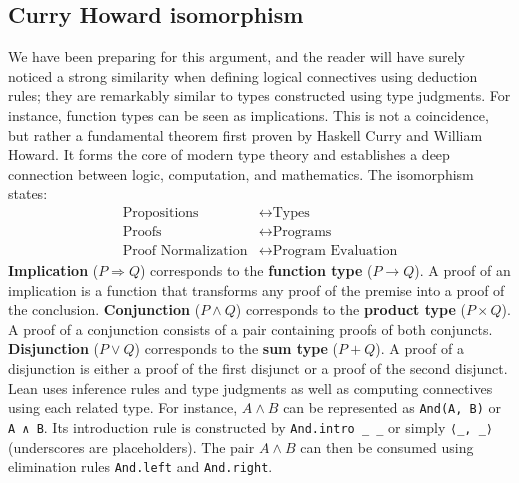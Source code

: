 \subsection{Curry Howard isomorphism}
We have been preparing for this argument, and the reader will have surely
noticed a strong similarity when defining logical connectives
using deduction rules; they are remarkably similar to types
constructed using type judgments. For instance, function
types can be seen as implications.
This is not a coincidence, but rather a fundamental theorem
first proven by Haskell Curry and William Howard.
It forms the core of modern type theory and establishes
a deep connection between logic, computation, and mathematics.
The isomorphism states:
\begin{align*}
  \text{Propositions}        & \leftrightarrow \text{Types}              \\
  \text{Proofs}              & \leftrightarrow \text{Programs}           \\
  \text{Proof Normalization} & \leftrightarrow \text{Program Evaluation}
\end{align*}
\noindent\textbf{Implication} ($P \Rightarrow Q$) corresponds to the \textbf{function type} ($P \to Q$).
A proof of an implication is a function that transforms any proof
of the premise into a proof of the conclusion.
\noindent\textbf{Conjunction} ($P \land Q$) corresponds
to the \textbf{product type} ($P \times Q$).
A proof of a conjunction consists of a pair containing proofs of both conjuncts.
\noindent\textbf{Disjunction} ($P \lor Q$) corresponds
to the \textbf{sum type} ($P + Q$).
A proof of a disjunction is either a proof of the
first disjunct or a proof of the second disjunct.
Lean uses inference rules and type
judgments as well as computing connectives using each related type.
For instance, $A \land B$ can be represented as \lstinline[language=lean]|And(A, B)| or \lstinline[language=lean]|A ∧ B|.
Its introduction rule is constructed by
\lstinline[language=lean]|And.intro _ _| or simply
\lstinline[language=lean]|⟨_, _⟩| (underscores are placeholders).
The pair $A \land B$ can then be consumed using elimination
rules \lstinline[language=lean]|And.left| and \lstinline[language=lean]|And.right|.

